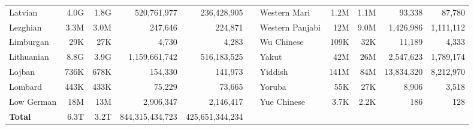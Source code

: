 \begin{table*}[t!]
{\begin{tabular}{@{}lrrrrclrrrr@{}}
            Latvian                   & 4.0G                     & 1.8G                      & 520,761,977              & 236,428,905               &                          & Western Mari              & 1.2M                     & 1.1M                      & 93,338                   & 87,780                    \\
            Lezghian                  & 3.3M                     & 3.0M                      & 247,646                  & 224,871                   &                          & Western Panjabi           & 12M                      & 9.0M                      & 1,426,986                & 1,111,112                 \\
            Limburgan                 & 29K                      & 27K                       & 4,730                    & 4,283                     &                          & Wu Chinese                & 109K                     & 32K                       & 11,189                   & 4,333                     \\
            Lithuanian                & 8.8G                     & 3.9G                      & 1,159,661,742            & 516,183,525               &                          & Yakut                     & 42M                      & 26M                       & 2,547,623                & 1,789,174                 \\
            Lojban                    & 736K                     & 678K                      & 154,330                  & 141,973                   &                          & Yiddish                   & 141M                     & 84M                       & 13,834,320               & 8,212,970                 \\
            Lombard                   & 443K                     & 433K                      & 75,229                   & 73,665                    &                          & Yoruba                    & 55K                      & 27K                       & 8,906                    & 3,518                     \\
            Low German                & 18M                      & 13M                       & 2,906,347                & 2,146,417                 &                          & Yue Chinese               & 3.7K                     & 2.2K                      & 186                      & 128                       \\
            \midrule
            \textbf{Total}            & 6.3T                     & 3.2T                      & 844,315,434,723          & 425,651,344,234           &                          &                           &                          &                           &                          &                           \\

\end{tabular}}
\end{table*}
